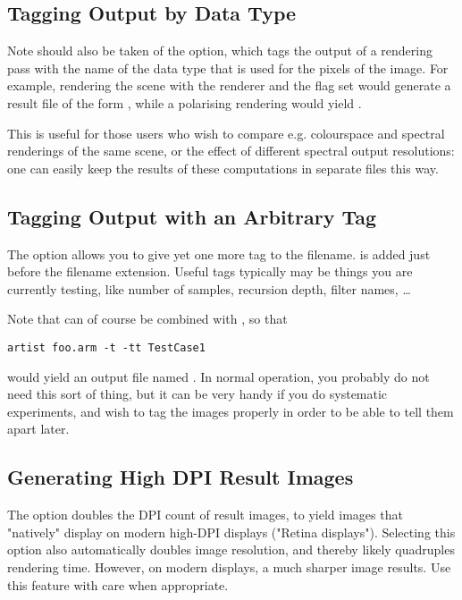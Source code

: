 \subsection{Tagging Output by Data Type}
Note should also be taken of the  option, which tags the output of a
rendering pass with the name of the data type that is used for the pixels of the image. For example,
rendering the scene  with the  renderer and
the  flag set would generate a result file of the form
, while a polarising  rendering would yield
.

This is useful for those users who wish to compare e.g. colourspace and spectral renderings of the same scene, or the effect of different spectral output resolutions: one can easily keep the results of these computations in separate files this way. 


\subsection{Tagging Output with an Arbitrary Tag}
The option  allows you to give yet one more tag
to the filename.   is added just before the
filename extension. Useful tags typically may be things you are currently
testing, like number of samples, recursion depth, filter names, \ldots

Note that  can of course be combined with , so that

\begin{verbatim}
artist foo.arm -t -tt TestCase1
\end{verbatim}

would yield an output file named . In normal operation, you probably do not need this sort of thing, but it can be very handy if you \eg do systematic experiments, and wish to tag the images properly in order to be able to tell them apart later.

\subsection{Generating High DPI Result Images}
The option  doubles the DPI count of result images, to yield images that "natively" display on modern high-DPI displays ("Retina displays"). Selecting this option also automatically doubles image resolution, and thereby likely quadruples rendering time. However, on modern displays, a much sharper image results. Use this feature with care when appropriate.

